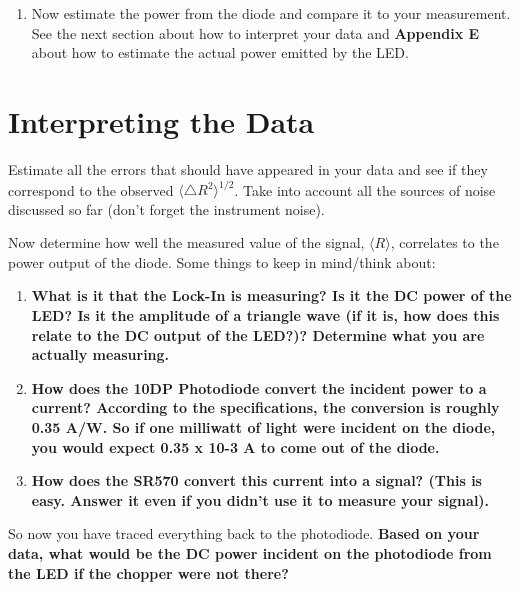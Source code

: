 \documentclass{../lab}
\begin{document}
\begin{enumerate}
    \item Now estimate the power from the diode and compare it to your measurement. See the next section about how to interpret your data and \textbf{Appendix E} about how to estimate the actual power emitted by the LED.

\end{enumerate}

\section{Interpreting the Data}

Estimate all the errors that should have appeared in your data and see if they correspond to the observed $\langle \triangle R^2 \rangle^{1/2}$. Take into account all the sources of noise discussed so far (don't forget the instrument noise).

Now determine how well the measured value of the signal, $\langle  R \rangle$, correlates to the power output of the diode. Some things to keep in mind/think about:

\begin{enumerate}
    \item \textbf{What is it that the Lock-In is measuring? Is it the DC power of the LED? Is it the amplitude of a triangle wave (if it is, how does this relate to the DC output of the LED?)? Determine what you are actually measuring.}

    \item \textbf{How does the 10DP Photodiode convert the incident power to a current? According to the specifications, the conversion is roughly 0.35 A/W. So if one milliwatt of light were incident on the diode, you would expect 0.35 x 10-3 A to come out of the diode. }

    \item \textbf{How does the SR570 convert this current into a signal? (This is easy. Answer it even if you didn't use it to measure your signal).}

\end{enumerate}

So now you have traced everything back to the photodiode. \textbf{Based on your data, what would be the DC power incident on the photodiode from the LED if the chopper were not there?}
\end{document}
